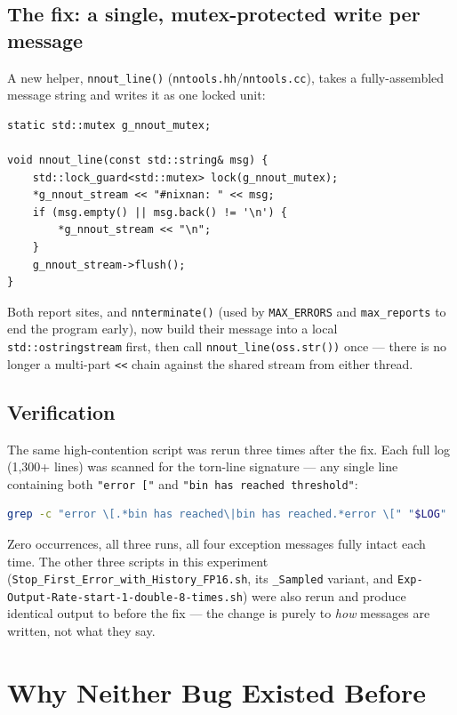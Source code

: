 \documentclass[11pt]{article}
\begin{document}
\subsection{The fix: a single, mutex-protected write per message}

A new helper, \texttt{nnout\_line()} (\texttt{nntools.hh}/\texttt{nntools.cc}), takes a
fully-assembled message string and writes it as one locked unit:
\begin{lstlisting}
static std::mutex g_nnout_mutex;

void nnout_line(const std::string& msg) {
    std::lock_guard<std::mutex> lock(g_nnout_mutex);
    *g_nnout_stream << "#nixnan: " << msg;
    if (msg.empty() || msg.back() != '\n') {
        *g_nnout_stream << "\n";
    }
    g_nnout_stream->flush();
}
\end{lstlisting}
Both report sites, and \texttt{nnterminate()} (used by \texttt{MAX\_ERRORS} and
\texttt{max\_reports} to end the program early), now build their message into a local
\texttt{std::ostringstream} first, then call \texttt{nnout\_line(oss.str())} once ---
there is no longer a multi-part \texttt{<<} chain against the shared stream from either
thread.

\subsection{Verification}

The same high-contention script was rerun three times after the fix. Each full log
(1{,}300+ lines) was scanned for the torn-line signature --- any single line containing
both \texttt{"error ["} and \texttt{"bin has reached threshold"}:
\begin{lstlisting}[language=bash]
grep -c "error \[.*bin has reached\|bin has reached.*error \[" "$LOG"
\end{lstlisting}
Zero occurrences, all three runs, all four exception messages fully intact each time.
The other three scripts in this experiment (\texttt{Stop\_First\_Error\_with\_History\_FP16.sh},
its \texttt{\_Sampled} variant, and \texttt{Exp-Output-Rate-start-1-double-8-times.sh}) were
also rerun and produce identical output to before the fix --- the change is purely to
\emph{how} messages are written, not what they say.

\section{Why Neither Bug Existed Before}
\end{document}
